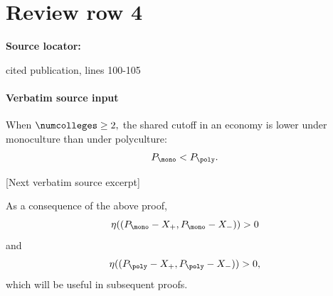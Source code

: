 \documentclass[10pt]{article}
\begin{document}
\section*{Review row 4}
\textbf{Source locator:} {\footnotesize\raggedright cited publication, lines 100-\allowbreak{}105\par}
\paragraph{Verbatim source input}
\begin{ReviewVerbatim}
\begin{corollary}\label{cor:cutoff-inequality}
When $\numcolleges \ge 2,$ the shared cutoff in an economy is lower under monoculture than under polyculture:
    \begin{equation}
        P_{\mono} < P_{\poly}.
    \end{equation}
\end{corollary}

[Next verbatim source excerpt]

As a consequence of the above proof,
\begin{equation}\label{eq:interval-mono}
    \eta((P_{\mono} - X_+, P_{\mono} - X_-)) > 0
\end{equation}
and
\begin{equation}\label{eq:interval-poly}
    \eta((P_{\poly} - X_+, P_{\poly} - X_-)) > 0,
\end{equation}
which will be useful in subsequent proofs.


\end{ReviewVerbatim}
\end{document}
